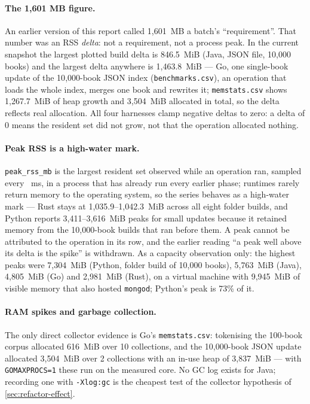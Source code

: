 \paragraph{The 1{,}601 MB figure.}
An earlier version of this report called 1{,}601~MB a batch's
``requirement''. That number was an RSS \emph{delta}: not a requirement, not
a process peak. In the current snapshot the largest plotted build delta is
846.5~MiB (Java, JSON file, 10{,}000 books) and the largest delta anywhere
is 1{,}463.8~MiB --- Go, one single-book update of the 10{,}000-book JSON
index (\texttt{benchmarks.csv}), an operation that loads the whole index,
merges one book and rewrites it; \texttt{memstats.csv} shows 1{,}267.7~MiB
of heap growth and 3{,}504~MiB allocated in total, so the delta reflects
real allocation. All four harnesses clamp negative deltas to zero: a delta
of 0 means the resident set did not grow, not that the operation allocated
nothing.

\paragraph{Peak RSS is a high-water mark.}
\texttt{peak\_rss\_mb} is the largest resident set observed while an
operation ran, sampled every ~ms, in a process that has already run
every earlier phase; runtimes rarely return memory to the operating system,
so the series behaves as a high-water mark --- Rust stays at
1{,}035.9--1{,}042.3~MiB across all eight folder builds, and Python reports
3{,}411--3{,}616~MiB peaks for small updates because it retained memory from
the 10{,}000-book builds that ran before them. A peak cannot be attributed
to the operation in its row, and the earlier reading ``a peak well above its
delta is the spike'' is withdrawn. As a capacity observation only: the
highest peaks were 7{,}304~MiB (Python, folder build of 10{,}000 books),
5{,}763~MiB (Java), 4{,}805~MiB (Go) and 2{,}981~MiB (Rust), on a virtual
machine with 9{,}945~MiB of visible memory that also hosted \texttt{mongod};
Python's peak is 73\% of it.

\paragraph{RAM spikes and garbage collection.}
The only direct collector evidence is Go's \texttt{memstats.csv}:
tokenising the 100-book corpus allocated 616~MiB over 10 collections, and
the 10{,}000-book JSON update allocated 3{,}504~MiB over 2 collections with
an in-use heap of 3{,}837~MiB --- with \texttt{GOMAXPROCS=1} these run on
the measured core. No GC log exists for Java; recording one with
\texttt{-Xlog:gc} is the cheapest test of the collector hypothesis of
\cref{sec:refactor-effect}.

